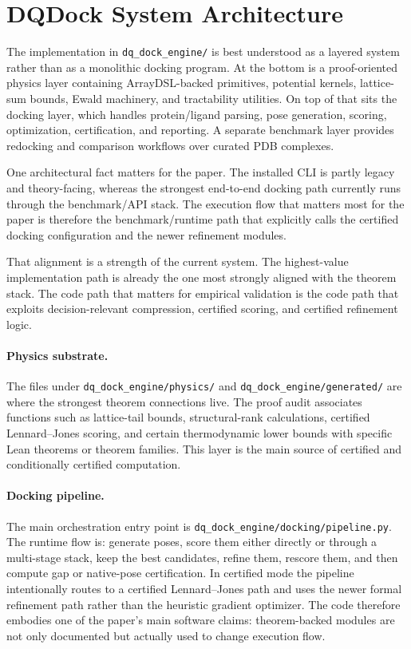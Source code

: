\section{DQDock System Architecture}\label{sec:system}

The implementation in \texttt{dq\_dock\_engine/} is best understood as a layered system rather than as a monolithic docking program. At the bottom is a proof-oriented physics layer containing ArrayDSL-backed primitives, potential kernels, lattice-sum bounds, Ewald machinery, and tractability utilities. On top of that sits the docking layer, which handles protein/ligand parsing, pose generation, scoring, optimization, certification, and reporting. A separate benchmark layer provides redocking and comparison workflows over curated PDB complexes.

One architectural fact matters for the paper. The installed CLI is partly legacy and theory-facing, whereas the strongest end-to-end docking path currently runs through the benchmark/API stack. The execution flow that matters most for the paper is therefore the benchmark/runtime path that explicitly calls the certified docking configuration and the newer refinement modules.

That alignment is a strength of the current system. The highest-value implementation path is already the one most strongly aligned with the theorem stack. The code path that matters for empirical validation is the code path that exploits decision-relevant compression, certified scoring, and certified refinement logic.

\paragraph{Physics substrate.}
The files under \texttt{dq\_dock\_engine/physics/} and \texttt{dq\_dock\_engine/generated/} are where the strongest theorem connections live. The proof audit associates functions such as lattice-tail bounds, structural-rank calculations, certified Lennard--Jones scoring, and certain thermodynamic lower bounds with specific Lean theorems or theorem families. This layer is the main source of certified and conditionally certified computation.

\paragraph{Docking pipeline.}
The main orchestration entry point is \texttt{dq\_dock\_engine/docking/pipeline.py}. The runtime flow is: generate poses, score them either directly or through a multi-stage stack, keep the best candidates, refine them, rescore them, and then compute gap or native-pose certification. In certified mode the pipeline intentionally routes to a certified Lennard--Jones path and uses the newer formal refinement path rather than the heuristic gradient optimizer. The code therefore embodies one of the paper's main software claims: theorem-backed modules are not only documented but actually used to change execution flow.

